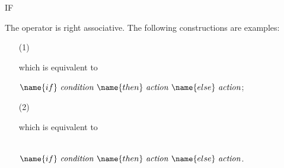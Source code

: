 \begin{Command}{IF}
\begin{Comments}
The  operator is right associative.  The following constructions are
examples:
\begin{itemize}
\item[(1)]
\begin{Syntax}
     
            
\end{Syntax}

which is equivalent to
\begin{Syntax}
   \(\name{if}\ \meta{condition}
\ \name{then}\ \meta{action}\ \name{else}\ \meta{action}\);
\end{Syntax}

\item[(2)]
\begin{Syntax}
    
     
\end{Syntax}
which is equivalent to
\begin{Syntax}
\     \\
    \(\name{if}\ \meta{condition}\ \name{then}\ \meta{action}
\ \name{else}\ \meta{action}\).
\end{Syntax}
\end{itemize}
\end{Comments}
\end{Command}


